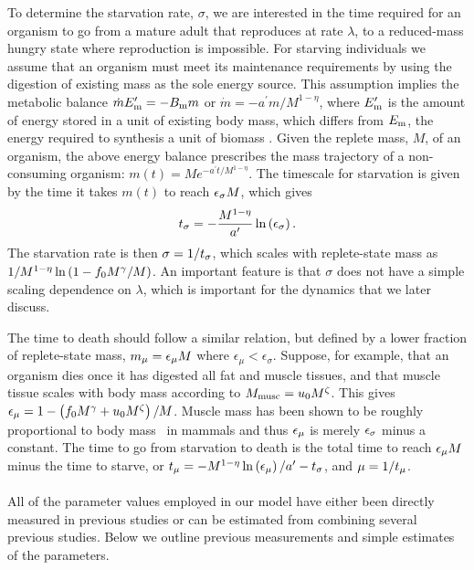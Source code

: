 \documentclass[twocolumn,preprintnumbers,amsmath,amssymb,superscriptaddress]{revtex4}
\begin{document}
{To determine the starvation rate, $\sigma$, we are interested in the time
required for an organism to go from a mature adult that reproduces at rate
$\lambda$, to a reduced-mass hungry state where reproduction is impossible.
For starving individuals we assume that an organism must meet its maintenance
requirements by using the digestion of existing mass as the sole energy
source.  This assumption implies the metabolic balance
$\dot{m}E_{\rm m}^{\prime}=-B_{\rm m}m$ or $\dot{m}=-a^{\prime}m/M^{1-\eta}$,
where $E_{\rm m}^{\prime}$ is the amount of energy stored in a unit of existing
body mass, which differs from $E_{\rm m}$, the energy required to
synthesis a unit of biomass \citep{hou}. Given the replete mass, $M$, of an organism, the
above energy balance prescribes the mass trajectory of a non-consuming
organism: $m\left(t\right)=Me^{-a^{\prime}t/M^{1-\eta}}$.
The timescale for starvation is
given by the time it takes $m(t)$ to reach $\epsilon_{\rm \sigma} M$, which gives
\begin{equation}
\label{eq:sigma}
t_{\rm \sigma}=-\frac{M^{1-\eta}}{a^{\prime}}\ln\left(\epsilon_{\rm \sigma}\right).
\end{equation}
The starvation rate is then $\sigma=1/t_{\rm \sigma}$, which scales with
replete-state mass as $1/M^{1-\eta}\ln\left(1-f_{\rm 0}M^{\gamma}/M\right)$.  An important
feature is that $\sigma$ does not have a simple scaling dependence on
$\lambda$, which is important for the dynamics that we
later discuss.

The time to death should follow a similar relation, but defined by a lower
fraction of replete-state mass, $m_{\rm \mu}=\epsilon_{\rm \mu} M$ where $\epsilon_\mu < \epsilon_\sigma$.
Suppose, for example, that an organism dies once it has digested all fat and
muscle tissues, and that muscle tissue scales with body mass according to
$M_{\rm \rm musc}=u_{\rm 0}M^{\zeta}$.  This gives
$\epsilon_{\rm \mu}=1-\left(f_{\rm 0}M^{\gamma}+u_{\rm 0}M^{\zeta}\right)/M$. Muscle
mass has been shown to be roughly proportional to body mass~\citep{Folland:2008ij} in
mammals and thus $\epsilon_{\rm \mu}$ is merely $\epsilon_{\rm \sigma}$ minus a constant. The time to go from starvation to death is the total time to reach $\epsilon_{\rm \mu}M$ minus the time to starve, or $t_{\rm \mu}=-M^{1-\eta}\ln\left(\epsilon_{\rm \mu}\right)/a^{\prime}-t_{\rm \sigma}$, and $\mu=1/t_{\rm \mu}$.\\


\\
All of the parameter values employed in our model have either been directly measured in previous studies or can be estimated from combining several previous studies. Below we outline previous measurements and simple estimates of the parameters.

}
\end{document}
